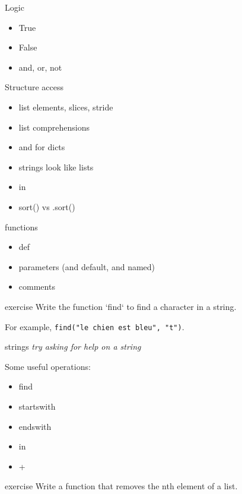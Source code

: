 \begin{frame}{Logic}
  \begin{itemize}
  \item True
  \item False
  \item and, or, not
  \end{itemize}
\end{frame}

\begin{frame}{Structure access}
  \begin{itemize}
  \item list elements, slices, stride
  \item list comprehensions
  \item and for dicts
  \item strings look like lists
  \item in
  \item sort() vs .sort()
  \end{itemize}
\end{frame}

\begin{frame}{functions}
  \begin{itemize}
  \item def
  \item parameters (and default, and named)
  \item comments
  \end{itemize}
\end{frame}

\begin{frame}{exercise}
  Write the function `find` to find a character in a string.

  For example, \texttt{find("le chien est bleu", "t")}.
\end{frame}

\begin{frame}{strings}
  \textit{try asking for help on a string}

  Some useful operations:
  \begin{itemize}
  \item find
  \item startswith
  \item endswith
  \item in
  \item +
  \end{itemize}
\end{frame}

\begin{frame}{exercise}
  Write a function that removes the nth element of a list.
\end{frame}

